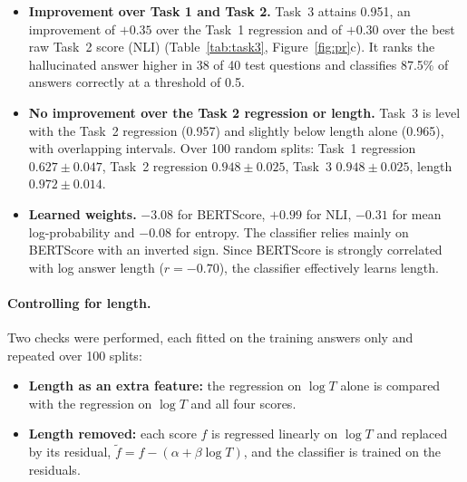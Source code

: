 \documentclass[11pt,a4paper]{article}
\begin{document}
\begin{itemize}
  \item \textbf{Improvement over Task 1 and Task 2.} Task~3 attains 0.951, an improvement of
        $+0.35$ over the Task~1 regression and of $+0.30$ over the best raw Task~2 score (NLI)
        (Table~\ref{tab:task3}, Figure~\ref{fig:pr}c). It ranks the hallucinated answer
        higher in 38 of 40 test questions and classifies 87.5\% of answers correctly at a threshold
        of 0.5.
  \item \textbf{No improvement over the Task 2 regression or length.} Task~3 is level with the
        Task~2 regression (0.957) and slightly below length alone (0.965), with overlapping
        intervals. Over 100 random splits: Task~1 regression $0.627 \pm 0.047$, Task~2 regression
        $0.948 \pm 0.025$, Task~3 $0.948 \pm 0.025$, length $0.972 \pm 0.014$.
  \item \textbf{Learned weights.} $-3.08$ for BERTScore, $+0.99$ for NLI, $-0.31$ for mean
        log-probability and $-0.08$ for entropy. The classifier relies mainly on BERTScore with an
        inverted sign. Since BERTScore is strongly correlated with log answer length ($r=-0.70$),
        the classifier effectively learns length.
\end{itemize}

\paragraph{Controlling for length.} Two checks were performed, each fitted on the training answers
only and repeated over 100 splits:
\begin{itemize}
  \item \textbf{Length as an extra feature:} the regression on $\log T$ alone is compared with the
        regression on $\log T$ and all four scores.
  \item \textbf{Length removed:} each score $f$ is regressed linearly on $\log T$ and replaced by
        its residual, $\tilde{f} = f - (\alpha + \beta \log T)$, and the classifier is trained on
        the residuals.
\end{itemize}
\end{document}
